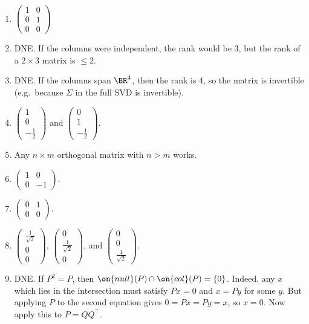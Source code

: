 \documentclass[10pt]{amsart}
\theoremstyle{mythm}
\theoremstyle{definition}
\theoremstyle{myrmk}
\begin{document}
	\begin{enumerate}
		\item $\begin{pmatrix}
			1 & 0 \\ 0 & 1 \\ 0 & 0 
		\end{pmatrix}$
		\item DNE. If the columns were independent, the rank would be $3$, but the rank of a $2 \times 3$ matrix is $\le 2$. 
		\item DNE. If the columns span $\BR^4$, then the rank is 4, so the matrix is invertible (e.g.\ because $\Sigma$ in the full SVD is invertible). 
		\item $\begin{pmatrix}
		1 \\ 0 \\ -\frac12
		\end{pmatrix}$ and $\begin{pmatrix}
		0 \\ 1 \\ -\frac12
		\end{pmatrix}$. 
		\item Any $n \times m$ orthogonal matrix with $n > m$ works. 
		\item $\begin{pmatrix}
		1 & 0 \\ 0 & -1
		\end{pmatrix}$. 
		\item $\begin{pmatrix}
		0 & 1 \\ 0 & 0 
		\end{pmatrix}$. 
		\item $\begin{pmatrix}
		\frac{1}{\sqrt2} \\ 0 \\ 0 
		\end{pmatrix}$, $\begin{pmatrix}
		0 \\ \frac{1}{\sqrt2} \\ 0 
		\end{pmatrix}$, and $\begin{pmatrix}
		0 \\ 0 \\ \frac{1}{\sqrt2}
		\end{pmatrix}$. 
		\item DNE. If $P^2 = P$, then $\on{null}(P) \cap \on{col}(P) = \{0\}$. Indeed, any $x$ which lies in the intersection must satisfy $Px = 0$ and $x = Py$ for some $y$. But applying $P$ to the second equation gives $0 = Px = Py = x$, so $x = 0$. Now apply this to $P = QQ^\top$. 

\end{enumerate}
\end{document}
